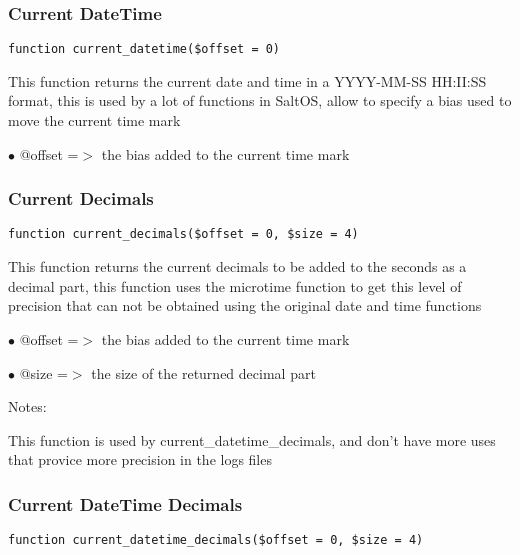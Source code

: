 \documentclass[a4paper]{article}
\begin{document}
\hypertarget{toc99}{}
\subsubsection{Current DateTime}

\begin{lstlisting}
function current_datetime($offset = 0)
\end{lstlisting}

This function returns the current date and time in a YYYY-MM-SS HH:II:SS format,
this is used by a lot of functions in SaltOS, allow to specify a bias used to
move the current time mark

\begin{compactitem}
\item[\color{myblue}$\bullet$] @offset =$>$ the bias added to the current time mark
\end{compactitem}

\hypertarget{toc100}{}
\subsubsection{Current Decimals}

\begin{lstlisting}
function current_decimals($offset = 0, $size = 4)
\end{lstlisting}

This function returns the current decimals to be added to the seconds as a
decimal part, this function uses the microtime function to get this level of
precision that can not be obtained using the original date and time functions

\begin{compactitem}
\item[\color{myblue}$\bullet$] @offset =$>$ the bias added to the current time mark
\item[\color{myblue}$\bullet$] @size   =$>$ the size of the returned decimal part
\end{compactitem}

Notes:

This function is used by current\_datetime\_decimals, and don't have more uses
that provice more precision in the logs files

\hypertarget{toc101}{}
\subsubsection{Current DateTime Decimals}

\begin{lstlisting}
function current_datetime_decimals($offset = 0, $size = 4)
\end{lstlisting}
\end{document}
